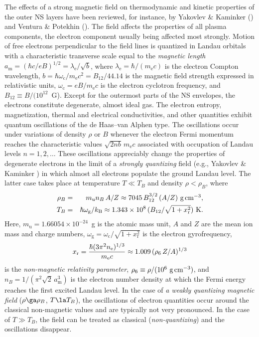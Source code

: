 \documentclass{aa}
\begin{document}
The effects of a strong magnetic field
on thermodynamic and kinetic properties
of the outer NS layers
have been reviewed, for instance, by
Yakovlev \& Kaminker (\cite{YaK}) and
Ventura \& Potekhin (\cite{elounda}).
The field affects the properties
of all plasma components, the electron
component usually being affected most strongly.
Motion of free electrons perpendicular to the field lines
is quantized in Landau orbitals
with a characteristic transverse scale equal to
the \emph{magnetic length}
$a_\mathrm{m}=(\hbar c/eB)^{1/2}=\lambda_\mathrm{e}/\sqrt{b}$,
where $\lambda_\mathrm{e}=\hbar/(m_\mathrm{e} c)$
is the electron Compton wavelength,
$b=\hbar\omega_\mathrm{c}/m_\mathrm{e} c^2 = B_{12}/44.14$ 
is the magnetic field strength  expressed in relativistic units,
$\omega_\mathrm{c}={eB/m_\mathrm{e} c}$
is the electron cyclotron frequency,
and $B_{12}\equiv B/(10^{12}$~G).
Except for the outermost parts of the NS envelopes,
the electrons constitute degenerate, almost ideal gas.
The electron entropy,
magnetization, thermal and electrical conductivities,
and other quantities
exhibit quantum oscillations of the de Haas--van Alphen type.
The oscillations occur under variations of density $\rho$ or $B$
whenever the electron Fermi momentum reaches the characteristic values
$\sqrt{2nb}\,m_\mathrm{e} c$
associated with occupation of Landau levels
$n=1,2,\ldots$
These oscillations appreciably change the properties
of degenerate electrons in the
limit of a {\it strongly quantizing\/} field
(e.g., Yakovlev \& Kaminker \cite{YaK})
in which almost all electrons populate the ground Landau level.
The latter case takes place 
at temperature $T\ll T_B$ and density $\rho<\rho_B$, where
%
\begin{eqnarray}
   \rho_B & = & m_\mathrm{u} n_B \, A/Z
  \approx 7045
       \,B_{12}^{3/2}\,(A/Z)\mbox{~g\,cm$^{-3}$},
\label{rho_B}
\\
    T_B & = &
    {\hbar\omega_\mathrm{g}/k_\mathrm{B}} \approx
             {1.343\times10^8\, (B_{12}/\sqrt{1+x_\mathrm{r}^2})}{\rm~K}.
\label{T_B}
\end{eqnarray}
%
Here, $m_\mathrm{u} = 1.66054\times10^{-24}$~g is the atomic mass unit,
$A$ and $Z$ 
are the mean ion mass and charge numbers,
$\omega_\mathrm{g}=\omega_\mathrm{c}/\sqrt{1+x_\mathrm{r}^2}$ 
is the electron gyrofrequency,
%
\begin{equation}
   x_\mathrm{r} = {{\hbar(3\pi^2n_\mathrm{e})^{1/3}}\over{m_\mathrm{e} c}}
   \approx
   1.009 \,(\rho_6\,Z/ A )^{1/3}
   \label{x_r}
\end{equation}
%
is the \emph{non-magnetic
relativity parameter}, $\rho_6\equiv\rho/(10^6\mbox{~g\,cm$^{-3}$})$,
and 
$n_B=1/(\pi^2\sqrt2\,a_\mathrm{m}^3)$ is the electron number density
at which the Fermi energy reaches the first excited Landau level.
In the case of \emph{a weakly quantizing magnetic field}
($\rho \ga \rho_B$, $T \la T_B$), the oscillations of
electron quantities occur
around the classical non-magnetic values and are typically
not very pronounced.
In the case of $T \gg T_B$,
the field can be treated as classical (\emph{non-quantizing})
and the oscillations disappear.
\end{document}
